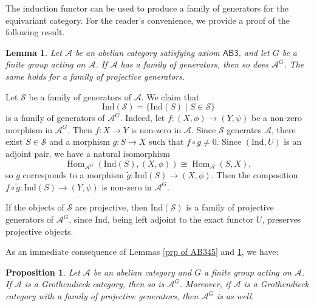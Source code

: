 \documentclass[12pt,twoside]{amsart}
\theoremstyle{bfupright head,slanted body}
\theoremstyle{bfupright head,upright body}
\theoremstyle{fixed bf head,slanted body}
\newtheorem{prp}[res]{Proposition}      \newtheorem*{prp*}{Proposition}
\newtheorem{lem}[res]{Lemma}            \newtheorem*{lem*}{Lemma}
\theoremstyle{fixed bf head,upright body}
\theoremstyle{numbered paragraph}
\newenvironment{prf*}[1][Proof]{%
  \begin{proof}[\bf #1]
    \setcounter{equation}{0}
    \renewcommand{\theequation}{\arabic{equation}}}
  {\end{proof}
}
\numberwithin{equation}{res}
\newcommand{\calA}{\mathcal{A}}
\newcommand{\calS}{\mathcal{S}}
\newcommand{\Ind}{\mathrm{Ind}}
\newcommand{\Hom}{\operatorname{Hom}}
\begin{document}
The induction functor can be used to produce a family of generators for the equivariant category.
For the reader's convenience, we provide a proof of the following result.

\begin{lem} \label{prp of generator}
Let \(\calA\) be an abelian category satisfying axiom \(\textsf{AB3}\), and let \(G\) be a finite group acting on \(\calA\).
If \(\calA\) has a family of generators, then so does \(\calA^G\).
The same holds for a family of projective generators.
\end{lem}

\begin{prf*}
Let \(\calS\) be a family of generators of \(\calA\).
We claim that
\[
\Ind(\calS)=\{\Ind(S)\mid S\in\calS\}
\]
is a family of generators of \(\calA^G\).
Indeed, let \(f:(X,\phi)\to(Y,\psi)\) be a non-zero morphism in \(\calA^G\).
Then \(f:X\to Y\) is non-zero in \(\calA\).
Since \(\calS\) generates \(\calA\), there exist \(S\in\calS\) and a morphism \(g:S\to X\) such that \(f\circ g\neq 0\).
Since \((\Ind,U)\) is an adjoint pair, we have a natural isomorphism
\[
\Hom_{\calA^G}(\Ind(S),(X,\phi)) \cong \Hom_{\calA}(S,X),
\]
so \(g\) corresponds to a morphism \(\widetilde{g}:\Ind(S)\to(X,\phi)\).
Then the composition \(f\circ\widetilde{g}:\Ind(S)\to(Y,\psi)\) is non-zero in \(\calA^G\).

If the objects of \(\calS\) are projective, then \(\Ind(\calS)\) is a family of projective generators of \(\calA^G\), since \(\Ind\), being left adjoint to the exact functor \(U\), preserves projective objects.
\end{prf*}

As an immediate consequence of Lemmas \ref{prp of AB345} and \ref{prp of generator}, we have:

\begin{prp} \label{prp of Grothendieck}
Let \(\calA\) be an abelian category and \(G\) a finite group acting on \(\calA\).
If \(\calA\) is a Grothendieck category, then so is \(\calA^G\).
Moreover, if \(\calA\) is a Grothendieck category with a family of projective generators, then \(\calA^G\) is as well.
\end{prp}
\end{document}
